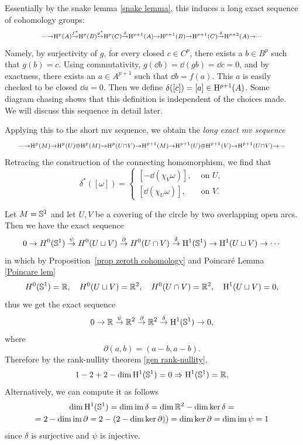 Essentially by the snake lemma \ref{snake lemma}, this induces a long exact sequence of cohomology groups:
\[
\scriptstyle
\cdots\to \mathrm{H}^p(A)\overset{f^\ast}\to \mathrm{H}^p(B)\overset{g^\ast}\to \mathrm{H}^p(C)\overset\delta\to \mathrm{H}^{p+1}(A)\to \mathrm{H}^{p+1}(B)\to \mathrm{H}^{p+1}(C)\overset\delta\to \mathrm{H}^{p+2}(A)\to \cdots
\]
Namely, by surjectivity of $g$, for every closed $c\in C^p$, there exists a $b\in B^p$ such that $g(b)=c$. Using commutativity,  $g(\dd b)=\dd (gb)=\dd c=0$, and by exactness, there exists an $a\in A^{p+1}$ such that $\dd b=f(a)$. This $a$ is easily checked to be closed $\dd a=0$. Then we define $\delta([c])=[a]\in \mathrm{H}^{p+1}(A)$. Some diagram chasing shows that this definition is independent of the choices made. We will discuss this sequence in detail later.

Applying this to the short \gls{mv} sequence, we obtain the \emph{long exact \gls{mv} sequence}
\[
\scriptstyle
\cdots\to \mathrm{H}^p(M)\to \mathrm{H}^p(U)\oplus \mathrm{H}^p(M)\to \mathrm{H}^p(U\cap V)\to \mathrm{H}^{p+1}(M)\to \mathrm{H}^{p+1}(U)\oplus \mathrm{H}^{p+1}(V)\to \mathrm{H}^{p+1}(U\cap V)\to \cdots
\]
Retracing the construction of the connecting homomorphism, we find that 
\[\delta^\ast([\omega])=
    \begin{cases}
        [-\dd (\chi_V \omega)],& \text{ on }U,\\
        [\dd (\chi_U \omega)],& \text{ on }V.
    \end{cases}
\]

\begin{example}\label{de Rham of circle}
    Let $M=\mathbb{S}^1$ and let $U,V$ be a covering of the circle by two overlapping open arcs. Then we have the exact sequence
    \[0\to H^0(\mathbb{S}^1)\overset\psi\to H^0(U\sqcup V)\overset\partial\to H^0(U\cap V)\overset\delta\to \mathrm{H}^1(\mathbb{S}^1)\to \mathrm{H}^1(U\sqcup V)\to \cdots \]
    in which by Proposition~\ref{prop zeroth cohomology} and Poincar\'e Lemma \ref{Poincare lem}
    \[H^0(\mathbb{S}^1)=\mathbb{R},\quad H^0(U\sqcup V)=\mathbb{R}^2,\quad H^0(U\cap V)=\mathbb{R}^2,\quad \mathrm{H}^1(U\sqcup V)=0,\]
    thus we get the exact sequence
    \[0\to \mathbb{R}\overset\psi\to \mathbb{R}^2\overset{\partial}\to \mathbb{R}^2\overset\delta\to \mathrm{H}^1(\mathbb{S}^1)\to 0,\]
    where
    \[\partial(a,b)=(a-b,a-b).\]
    Therefore by the rank-nullity theorem \ref{gen rank-nullity},
    \[1-2+2-\dim \mathrm{H}^1(\mathbb{S}^1)=0\Rightarrow \mathrm{H}^1(\mathbb{S}^1)=\mathbb{R}.\]
    Alternatively, we can compute it as follows
    \begin{multline}
        \dim \mathrm{H}^1(\mathbb{S}^1)=\dim \operatorname{im} \delta=\dim \mathbb{R}^2-\dim\ker\delta=\\=2-\dim\operatorname{im} \partial=2-(2-\dim\ker\partial))=\dim\ker\partial=\dim\operatorname{im}\psi =1
    \end{multline}
    since $\delta$ is surjective and $\psi$ is injective.
\end{example}


